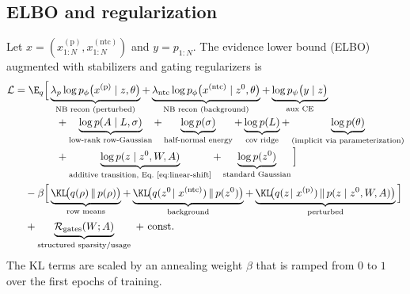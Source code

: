 \subsection{ELBO and regularization}
Let $x=(x^{(\mathrm{p})}_{1:N},x^{(\mathrm{ntc})}_{1:N})$ and $y=p_{1:N}$.
The evidence lower bound (ELBO) augmented with stabilizers and gating regularizers is
\begin{align}
  \mathcal{L}
  &= \E_{q}\Big[
        \underbrace{\lambda_{p}\log p_\phi\big(x^{(\mathrm{p})}\mid z,\theta\big)}_{\text{NB recon (perturbed)}}
      + \underbrace{\lambda_{\mathrm{ntc}}\log p_\phi\big(x^{(\mathrm{ntc})}\mid z^0,\theta\big)}_{\text{NB recon (background)}}
      + \underbrace{\log p_\psi\big(y\mid z\big)}_{\text{aux CE}}
\\[-2pt]&\qquad\qquad
      + \underbrace{\log p(A\mid L,\sigma)}_{\text{low-rank row-Gaussian}}
      + \underbrace{\log p(\sigma)}_{\text{half-normal energy}}
      + \underbrace{\log p(L)}_{\text{cov ridge}}
      + \underbrace{\log p(\theta)}_{\text{(implicit via parameterization)}}
\\[-2pt]&\qquad\qquad
      + \underbrace{\log p(z \mid z^0, W, A)}_{\text{additive transition, Eq.~\eqref{eq:linear-shift}}}
      + \underbrace{\log p(z^0)}_{\text{standard Gaussian}}
    \Big]
\\&\quad
  - \beta\Big[
    \underbrace{\KL\!\big(q(\rho)\,\|\,p(\rho)\big)}_{\text{row means}}
  + \underbrace{\KL\!\big(q(z^0\!\mid x^{(\mathrm{ntc})})\,\|\,p(z^0)\big)}_{\text{background}}
  + \underbrace{\KL\!\big(q(z\!\mid x^{(\mathrm{p})})\,\|\,p(z\mid z^0,W,A)\big)}_{\text{perturbed}}
  \Big]
\\&\quad
  + \underbrace{\mathcal{R}_{\text{gates}}(W;A)}_{\text{structured sparsity/usage}}
  \ +\ \text{const}.
  \label{eq:full-elbo}
\end{align}
The KL terms are scaled by an annealing weight $\beta$ that is ramped from $0$ to $1$ over the first
epochs of training.

